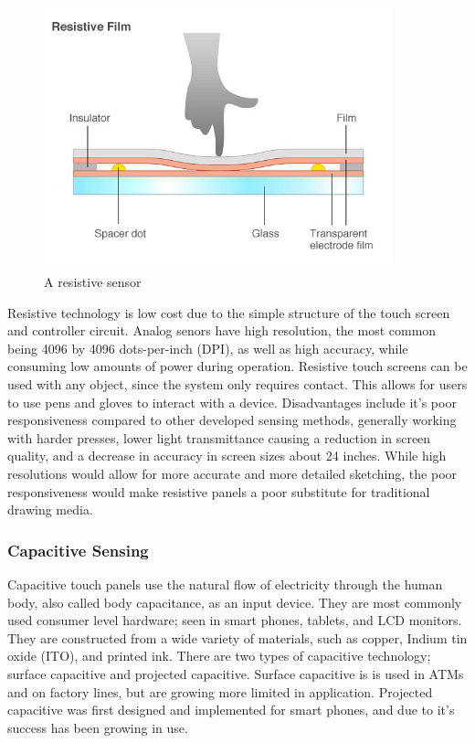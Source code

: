 \documentclass[11pt]{report}
\begin{document}
\begin{center}
\begin{figure}
\includegraphics[width=0.9\textwidth]{resistive}
\caption{A resistive sensor}
\end{figure}
\end{center}

Resistive technology is low cost due to the simple structure of the touch screen and controller circuit.
Analog senors have high resolution, the most common being 4096 by 4096 dots-per-inch (DPI), as well as high accuracy, while consuming low amounts of power during operation.
Resistive touch screens can be used with any object, since the system only requires contact. 
This allows for users to use pens and gloves to interact with a device.
Disadvantages include it's poor responsiveness compared to other developed sensing methods, generally working with harder presses, lower light transmittance causing a reduction in screen quality, and a decrease in accuracy in screen sizes about 24 inches.
While high resolutions would allow for more accurate and more detailed sketching, the poor responsiveness would make resistive panels a poor substitute for traditional drawing media.

 




\subsubsection{Capacitive Sensing}
Capacitive touch panels use the natural flow of electricity through the human body, also called body capacitance, as an input device.
They are most commonly used consumer level hardware; seen in smart phones, tablets, and LCD monitors.
They are constructed from a wide variety of materials, such as copper, Indium tin oxide (ITO), and printed ink.
There are two types of capacitive technology; surface capacitive and projected capacitive.
Surface capacitive is is used in ATMs and on factory lines, but are growing more limited in application.
Projected capacitive was first designed and implemented for smart phones, and due to it's success has been growing in use.
\end{document}
